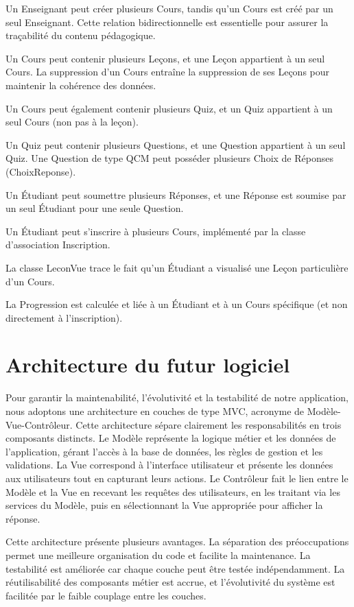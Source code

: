\documentclass[12pt,a4paper]{report}
\begin{document}
Un Enseignant peut créer plusieurs Cours, tandis qu'un Cours est créé par un seul Enseignant. Cette relation bidirectionnelle est essentielle pour assurer la traçabilité du contenu pédagogique.

Un Cours peut contenir plusieurs Leçons, et une Leçon appartient à un seul Cours. La suppression d'un Cours entraîne la suppression de ses Leçons pour maintenir la cohérence des données.

Un Cours peut également contenir plusieurs Quiz, et un Quiz appartient à un seul Cours (non pas à la leçon).

Un Quiz peut contenir plusieurs Questions, et une Question appartient à un seul Quiz. 
Une Question de type QCM peut posséder plusieurs Choix de Réponses (ChoixReponse).

Un Étudiant peut soumettre plusieurs Réponses, et une Réponse est soumise par un seul Étudiant pour une seule Question.

Un Étudiant peut s'inscrire à plusieurs Cours, implémenté par la classe d'association Inscription.

La classe LeconVue trace le fait qu'un Étudiant a visualisé une Leçon particulière d'un Cours.

La Progression est calculée et liée à un Étudiant et à un Cours spécifique (et non directement à l'inscription).

\section{Architecture du futur logiciel}
Pour garantir la maintenabilité, l'évolutivité et la testabilité de notre application, nous adoptons une architecture en couches de type MVC, acronyme de Modèle-Vue-Contrôleur. Cette architecture sépare clairement les responsabilités en trois composants distincts. Le Modèle représente la logique métier et les données de l'application, gérant l'accès à la base de données, les règles de gestion et les validations. La Vue correspond à l'interface utilisateur et présente les données aux utilisateurs tout en capturant leurs actions. Le Contrôleur fait le lien entre le Modèle et la Vue en recevant les requêtes des utilisateurs, en les traitant via les services du Modèle, puis en sélectionnant la Vue appropriée pour afficher la réponse.

Cette architecture présente plusieurs avantages. La séparation des préoccupations permet une meilleure organisation du code et facilite la maintenance. La testabilité est améliorée car chaque couche peut être testée indépendamment. La réutilisabilité des composants métier est accrue, et l'évolutivité du système est facilitée par le faible couplage entre les couches.
\end{document}
